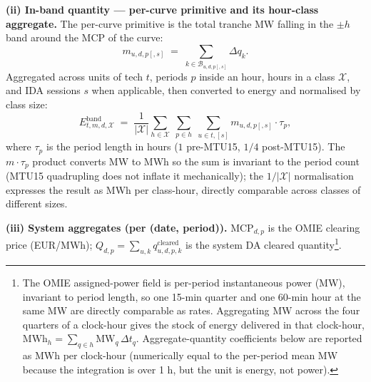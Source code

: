 \documentclass[11pt]{article}
\begin{document}
\textbf{(ii) In-band quantity --- per-curve primitive and its hour-class aggregate.} The per-curve primitive is the total tranche MW falling in the $\pm h$ band around the MCP of the curve:
\[
m_{u,d,p[,s]} \;=\; \sum_{k\in\mathcal{B}_{u,d,p[,s]}} \Delta q_k.
\]
Aggregated across units of tech $t$, periods $p$ inside an hour, hours in a class $\mathcal{X}$, and IDA sessions $s$ when applicable, then converted to energy and normalised by class size:
\[
E^{\text{band}}_{t,m,d,\mathcal{X}} \;=\; \frac{1}{|\mathcal{X}|}\sum_{h\in\mathcal{X}}\;\sum_{p\in h}\;\sum_{u\in t,[s]} m_{u,d,p[,s]} \cdot \tau_p,
\]
where $\tau_p$ is the period length in hours ($1$ pre-MTU15, $1/4$ post-MTU15). The $m\cdot\tau_p$ product converts MW to MWh so the sum is invariant to the period count (MTU15 quadrupling does not inflate it mechanically); the $1/|\mathcal{X}|$ normalisation expresses the result as MWh per class-hour, directly comparable across classes of different sizes.
\vspace{6pt}

\textbf{(iii) System aggregates (per (date, period)).} $\text{MCP}_{d,p}$ is the OMIE clearing price (EUR/MWh); $Q_{d,p}=\sum_{u,k} q^{\text{cleared}}_{u,d,p,k}$ is the system DA cleared quantity\footnote{The OMIE assigned-power field is per-period instantaneous power (MW), invariant to period length, so one 15-min quarter and one 60-min hour at the same MW are directly comparable as rates. Aggregating MW across the four quarters of a clock-hour gives the stock of energy delivered in that clock-hour, $\text{MWh}_h = \sum_{q\in h}\text{MW}_q\,\Delta t_q$. Aggregate-quantity coefficients below are reported as MWh per clock-hour (numerically equal to the per-period mean MW because the integration is over 1 h, but the unit is energy, not power).}.
\vspace{6pt}
\end{document}
